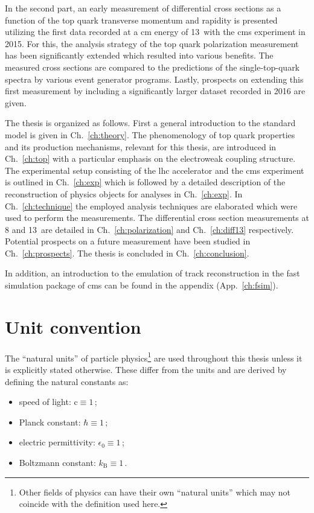 In the second part, an early measurement of differential cross sections as a function of the top quark transverse momentum and rapidity is presented utilizing the first data recorded at a \acrlong{cm} energy of 13~\TeV with the \gls{cms} experiment in 2015. For this, the analysis strategy of the top quark polarization measurement has been significantly extended which resulted into various benefits. The measured cross sections are compared to the predictions of the single-top-quark spectra by various event generator programs. Lastly, prospects on extending this first measurement by including a significantly larger dataset recorded in 2016 are given.

The thesis is organized as follows. First a general introduction to the standard model is given in Ch.~\ref{ch:theory}. The phenomenology of top quark properties and its production mechanisms, relevant for this thesis, are introduced in Ch.~\ref{ch:top} with a particular emphasis on the electroweak coupling structure. The experimental setup consisting of the \gls{lhc} accelerator and the \gls{cms} experiment is outlined in Ch.~\ref{ch:exp} which is followed by a detailed description of the reconstruction of physics objects for analyses in Ch.~\ref{ch:exp}. In Ch.~\ref{ch:technique} the employed analysis techniques are elaborated which were used to perform the measurements. The differential cross section measurements at 8 and 13~\TeV are detailed in Ch.~\ref{ch:polarization} and Ch.~\ref{ch:diff13} respectively. Potential prospects on a future measurement have been studied in Ch.~\ref{ch:prospects}. The thesis is concluded in Ch.~\ref{ch:conclusion}.

In addition, an introduction to the emulation of track reconstruction in the fast simulation package of \gls{cms} can be found in the appendix (App.~\ref{ch:fsim}).

\section*{Unit convention}

The ``natural units'' of particle physics\footnote{Other fields of physics can have their own ``natural units'' which may not coincide with the definition used here.} are used throughout this thesis unless it is explicitly stated otherwise. These differ from the  units and are derived by defining the natural constants as:

\begin{itemize}
\item speed of light: $\mathrm{c}\equiv 1$\,;
\item Planck constant: $\hbar\equiv 1$\,;
\item electric permittivity: $\epsilon_{0}\equiv 1$\,;
\item Boltzmann constant: $k_\mathrm{B}\equiv 1$\,.
\end{itemize}

